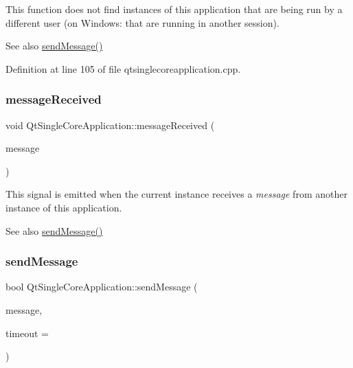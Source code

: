 This function does not find instances of this application that are being run by a different user (on Windows\+: that are running in another session).

\begin{DoxySeeAlso}{See also}
\hyperlink{class_qt_single_core_application_a07493d0807b216ca870adc6d40f856b0}{send\+Message()} 
\end{DoxySeeAlso}


Definition at line 105 of file qtsinglecoreapplication.\+cpp.

\mbox{\label{class_qt_single_core_application_a1af66a1770ff5eec8006a26a2ce42ca1}} 
\subsubsection{\texorpdfstring{message\+Received}{messageReceived}}
{\footnotesize\ttfamily void Qt\+Single\+Core\+Application\+::message\+Received (\begin{DoxyParamCaption}\item[{const Q\+String \&}]{message }\end{DoxyParamCaption})\hspace{0.3cm}{\ttfamily [signal]}}

This signal is emitted when the current instance receives a {\itshape message} from another instance of this application.

\begin{DoxySeeAlso}{See also}
\hyperlink{class_qt_single_core_application_a07493d0807b216ca870adc6d40f856b0}{send\+Message()} 
\end{DoxySeeAlso}
\mbox{\label{class_qt_single_core_application_a07493d0807b216ca870adc6d40f856b0}} 
\subsubsection{\texorpdfstring{send\+Message}{sendMessage}}
{\footnotesize\ttfamily bool Qt\+Single\+Core\+Application\+::send\+Message (\begin{DoxyParamCaption}\item[{const Q\+String \&}]{message,  }\item[{int}]{timeout = {} }\end{DoxyParamCaption})\hspace{0.3cm}{\ttfamily [slot]}}

